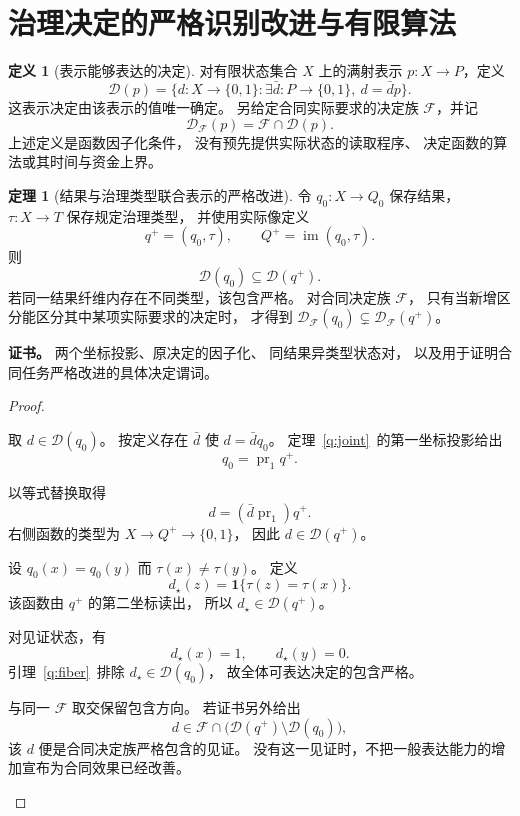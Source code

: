 \documentclass[UTF8,12pt,a4paper,openany,fontset=none,zihao=false]{ctexrep}
\theoremstyle{definition}
\newtheorem{definition}{定义}[chapter]
\newtheorem{theorem}{定理}[chapter]
\newenvironment{certificate}{\par\noindent\textbf{证书。}\ignorespaces}{\par}
\newcommand{\1}{\mathbf 1}
\begin{document}
\section{治理决定的严格识别改进与有限算法}

\begin{definition}[表示能够表达的决定]
\label{std:decision-family}
对有限状态集合 \(X\) 上的满射表示 \(p:X\to P\)，定义
\[
\mathcal D(p)=
\{d:X\to\{0,1\}:
\exists\bar d:P\to\{0,1\},\ d=\bar d p\}.
\]
这表示决定由该表示的值唯一确定。
另给定合同实际要求的决定族 \(\mathcal F\)，并记
\[
\mathcal D_{\mathcal F}(p)=\mathcal F\cap\mathcal D(p).
\]
上述定义是函数因子化条件，
没有预先提供实际状态的读取程序、
决定函数的算法或其时间与资金上界。
\end{definition}

\begin{theorem}[结果与治理类型联合表示的严格改进]
\label{std:strict-decisions}
令 \(q_0:X\to Q_0\) 保存结果，
\(\tau:X\to T\) 保存规定治理类型，
并使用实际像定义
\[
q^+=(q_0,\tau),\qquad
Q^+=\operatorname{im}(q_0,\tau).
\]
则
\[
\mathcal D(q_0)\subseteq\mathcal D(q^+).
\]
若同一结果纤维内存在不同类型，该包含严格。
对合同决定族 \(\mathcal F\)，
只有当新增区分能区分其中某项实际要求的决定时，
才得到
\(\mathcal D_{\mathcal F}(q_0)
\subsetneq\mathcal D_{\mathcal F}(q^+)\)。
\end{theorem}
\begin{certificate}
两个坐标投影、原决定的因子化、
同结果异类型状态对，
以及用于证明合同任务严格改进的具体决定谓词。
\end{certificate}
\begin{proof}
\begin{semanticsteps}
\item 取 \(d\in\mathcal D(q_0)\)。
按定义存在 \(\bar d\) 使 \(d=\bar d q_0\)。
定理~\ref{q:joint}~的第一坐标投影给出
\[
q_0=\operatorname{pr}_1q^+.
\]
\item 以等式替换取得
\[
d=(\bar d\operatorname{pr}_1)q^+.
\]
右侧函数的类型为
\(X\to Q^+\to\{0,1\}\)，
因此 \(d\in\mathcal D(q^+)\)。
\item 设 \(q_0(x)=q_0(y)\) 而 \(\tau(x)\ne\tau(y)\)。
定义
\[
d_\star(z)=\mathbf1\{\tau(z)=\tau(x)\}.
\]
该函数由 \(q^+\) 的第二坐标读出，
所以 \(d_\star\in\mathcal D(q^+)\)。
\item 对见证状态，有
\[
d_\star(x)=1,\qquad d_\star(y)=0.
\]
引理~\ref{q:fiber}~排除
\(d_\star\in\mathcal D(q_0)\)，
故全体可表达决定的包含严格。
\item 与同一 \(\mathcal F\) 取交保留包含方向。
若证书另外给出
\[
d\in\mathcal F\cap
\bigl(\mathcal D(q^+)\setminus\mathcal D(q_0)\bigr),
\]
该 \(d\) 便是合同决定族严格包含的见证。
没有这一见证时，不把一般表达能力的增加宣布为合同效果已经改善。
\end{semanticsteps}
\end{proof}
\end{document}
